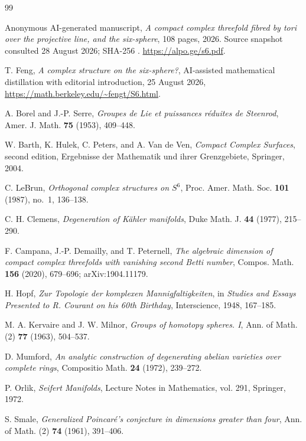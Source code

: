 \documentclass[11pt,reqno]{amsart}
\numberwithin{equation}{section}
\theoremstyle{definition}
\begin{document}
\begingroup
\makeatletter
\let\savedsection\section
\renewcommand{\section}{\@ifstar{\@gobble}{\savedsection}}
\makeatother
\begin{thebibliography}{99}

Anonymous AI-generated manuscript,
\emph{A compact complex threefold fibred by tori over the projective line, and the six-sphere},
108 pages, 2026. Source snapshot consulted 28 August 2026;
SHA-256 .
\url{https://alpo.ge/s6.pdf}.

T. Feng,
\emph{A complex structure on the six-sphere?},
AI-assisted mathematical distillation with editorial introduction, 25 August 2026,
\url{https://math.berkeley.edu/~fengt/S6.html}.

A. Borel and J.-P. Serre,
\emph{Groupes de Lie et puissances r\'eduites de Steenrod},
Amer. J. Math. \textbf{75} (1953), 409--448.

W. Barth, K. Hulek, C. Peters, and A. Van de Ven,
\emph{Compact Complex Surfaces}, second edition,
Ergebnisse der Mathematik und ihrer Grenzgebiete, Springer, 2004.


C. LeBrun,
\emph{Orthogonal complex structures on $S^6$},
Proc. Amer. Math. Soc. \textbf{101} (1987), no.~1, 136--138.

C. H. Clemens,
\emph{Degeneration of K\"ahler manifolds},
Duke Math. J. \textbf{44} (1977), 215--290.

F. Campana, J.-P. Demailly, and T. Peternell,
\emph{The algebraic dimension of compact complex threefolds with vanishing second Betti number},
Compos. Math. \textbf{156} (2020), 679--696;\newline
arXiv:1904.11179.

H. Hopf,
\emph{Zur Topologie der komplexen Mannigfaltigkeiten},
in \emph{Studies and Essays Presented to R. Courant on his 60th Birthday},
Interscience, 1948, 167--185.

M. A. Kervaire and J. W. Milnor,
\emph{Groups of homotopy spheres. I},
Ann. of Math. (2) \textbf{77} (1963), 504--537.

D. Mumford,
\emph{An analytic construction of degenerating abelian varieties over complete rings},
Compositio Math. \textbf{24} (1972), 239--272.

P. Orlik,
\emph{Seifert Manifolds},
Lecture Notes in Mathematics, vol. 291, Springer, 1972.

S. Smale,
\emph{Generalized Poincar\'e's conjecture in dimensions greater than four},
Ann. of Math. (2) \textbf{74} (1961), 391--406.

\end{thebibliography}
\endgroup
\end{document}
